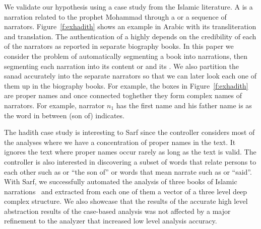 \documentclass[11pt]{article}
\newcommand{\noArRL}[1]{\arabfalse\RL{#1}\arabtrue}
\newcommand{\noTrRL}[1]{\transfalse\RL{#1}\transtrue}
\begin{document}
We validate our hypothesis using a case study from the Islamic 
literature. 
A  is a narration related to the prophet Mohammad
through a  or a sequence of narrators. 
Figure~\ref{f:exhadith} shows an example \noArRL{.hady_t} in Arabic with its 
transliteration and translation. 
The authentication of a \noArRL{.hady_t} highly depends on the credibility
of each of the narrators as reported in separate biography 
books. 
In this paper we consider the problem of automatically segmenting
a \noArRL{.hady_t} book into narrations, then segmenting each narration into
its content or  and its \noArRL{sanad}.
We also partition the sanad accurately into the 
separate narrators so that we can later look each one of them 
up in the biography books. 
For example, the boxes in Figure~\ref{f:exhadith} are proper names and once
connected toghether they form complex names of narrators. 
For example,
narrator $n_1$ has the first name \noTrRL{qtybT} and his father 
name is
\noTrRL{s`yd} as the word in between \noTrRL{bn} (son of) indicates. 

The hadith case study is interesting to Sarf since the controller
considers most of the analyses where we have a concentration
of proper names in the text. It ignores the text where
proper names occur rarely as long 
as the text is valid.
The controller is also interested in discovering a subset of words 
that relate persons to each other such as  or ``the son of''
or words that mean narrate such as  or ``said''. 
With Sarf, we successfully automated the analysis of 
three books of Islamic narrations~\cite{IbnHanbal,AlTousi,AlKulayni}
and extracted from each one of them a vector of a three level deep
complex structure. 
We also showcase that the results of the accurate high level 
abstraction
results of the case-based analysis was not affected by a major
refinement to the analyzer that increased low level analysis 
accuracy. 

\end{document}
